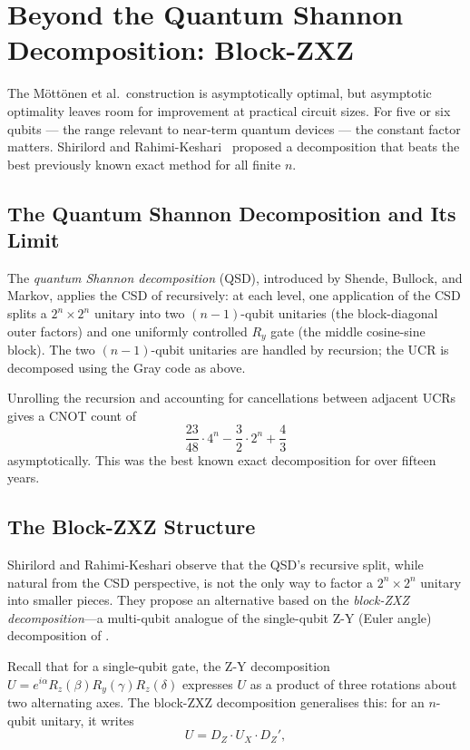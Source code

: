 \documentclass[12pt, a4paper, oneside]{report}
\theoremstyle{plain}
\theoremstyle{definition}
\theoremstyle{remark}
\newcommand{\Ry}{R_y}
\newcommand{\Rz}{R_z}
\begin{document}

\section{Beyond the Quantum Shannon Decomposition: Block-ZXZ}
\label{sec:block-zxz}

The Möttönen et al.\ construction is asymptotically optimal, but asymptotic optimality
leaves room for improvement at practical circuit sizes. For five or six qubits --- the range
relevant to near-term quantum devices --- the constant factor matters. Shirilord and
Rahimi-Keshari~\cite{shirilord2024} proposed a decomposition that beats the best previously
known exact method for all finite $n$.

\subsection{The Quantum Shannon Decomposition and Its Limit}

The \emph{quantum Shannon decomposition} (QSD), introduced by Shende, Bullock, and Markov,
applies the CSD of  recursively: at each level, one application of the CSD
splits a $2^n \times 2^n$ unitary into two $(n-1)$-qubit unitaries (the block-diagonal
outer factors) and one uniformly controlled $\Ry$ gate (the middle cosine-sine block). The
two $(n-1)$-qubit unitaries are handled by recursion; the UCR is decomposed using the Gray
code as above.

Unrolling the recursion and accounting for cancellations between adjacent UCRs gives a
CNOT count of
\[
	\frac{23}{48} \cdot 4^n - \frac{3}{2} \cdot 2^n + \frac{4}{3}
\]
asymptotically. This was the best known exact decomposition for over fifteen years.

\subsection{The Block-ZXZ Structure}

Shirilord and Rahimi-Keshari observe that the QSD's recursive split, while natural from the
CSD perspective, is not the only way to factor a $2^n \times 2^n$ unitary into smaller
pieces. They propose an alternative based on the \emph{block-ZXZ decomposition}---a
multi-qubit analogue of the single-qubit Z-Y (Euler angle) decomposition of .

Recall that for a single-qubit gate, the Z-Y decomposition $U = e^{i\alpha}\Rz(\beta)\Ry(\gamma)\Rz(\delta)$
expresses $U$ as a product of three rotations about two alternating axes. The block-ZXZ
decomposition generalises this: for an $n$-qubit unitary, it writes
\[
	U = D_Z \cdot U_X \cdot D_Z',
\]
\end{document}

